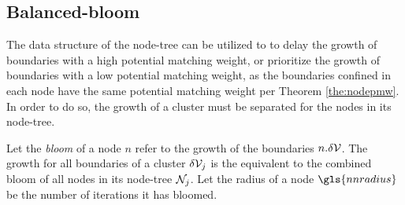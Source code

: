 

\subsection{Balanced-bloom}

The data structure of the node-tree can be utilized to to delay the growth of boundaries with a high potential matching weight, or prioritize the growth of boundaries with a low potential matching weight, as the boundaries confined in each node have the same potential matching weight per Theorem \ref{the:nodepmw}. In order to do so, the growth of a cluster must be separated for the nodes in its node-tree. 

\begin{definition}\label{def:bloom}
  Let the \emph{bloom} of a node $n$ refer to the growth of the boundaries $n.\delta\mathcal{V}$. The growth for all boundaries of a cluster $
  \delta\mathcal{V}_j$ is the equivalent to the combined bloom of all nodes in its node-tree $\mathcal{N}_j$. Let the radius of a node $\gls{nnradius}$ be the number of iterations it has bloomed. 
\end{definition}

